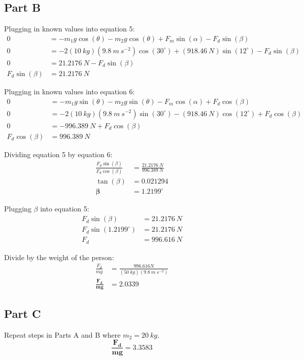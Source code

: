 \documentclass{article}
\begin{document}
\subsection*{Part B}

Plugging in known values into equation 5:
\begin{align*}
    0&=-m_1g\cos(\theta)-m_2g\cos(\theta)+F_m\sin(\alpha)-F_d\sin(\beta)\\
    0&=-2(10\ \si{kg})(9.8\ \si{m\ s^{-2}})\cos(30^{\circ})+(918.46\
    \si{N})\sin(12^{\circ})-F_d\sin(\beta)\\
    0&=21.2176\ \si{N}-F_{d}\sin(\beta)\\
    F_{d}\sin(\beta)&=21.2176\ \si{N}
\end{align*}

Plugging in known values into equation 6:
\begin{align*}
    0&=-m_1g\sin(\theta)-m_2g\sin(\theta)-F_m\cos(\alpha)+F_d\cos(\beta)\\
    0&=-2(10\ \si{kg})(9.8\ \si{m\ s^{-2}})\sin(30^{\circ})-(918.46\
    \si{N})\cos(12^{\circ})+F_d\cos(\beta)\\
    0&=-996.389\ \si{N}+F_{d}\cos(\beta)\\
    F_{d}\cos(\beta)&=996.389\ \si{N}
\end{align*}

Dividing equation 5 by equation 6:
\begin{align*}
    \frac{F_{d}\sin(\beta)}{F_{d}\cos(\beta)}&=\frac{21.2176\ \si{N}}{996.389\ \si{N}}\\
    \tan(\beta)&=0.021294\\
    \bm{\beta}&\bm{=1.2199^{\circ}}
\end{align*}

Plugging $\beta$ into equation 5:
\begin{align*}
    F_{d}\sin(\beta)&=21.2176\ \si{N}\\
    F_{d}\sin(1.2199^{\circ})&=21.2176\ \si{N}\\
    F_{d}&=996.616\ \si{N}
\end{align*}

Divide by the weight of the person:
\begin{align*}
    \frac{F_{d}}{mg}&=\frac{996.616 \si{N}}{(50\ \si{kg})(9.8\ \si{m\ s^{-2}})}\\
    \bm{\frac{F_{d}}{mg}}&\bm{=2.0339}
\end{align*}

\subsection*{Part C}
Repeat steps in Parts A and B where $m_2=20\ \si{kg}$.
$$\bm{\frac{F_{d}}{mg}=3.3583}$$
\end{document}
